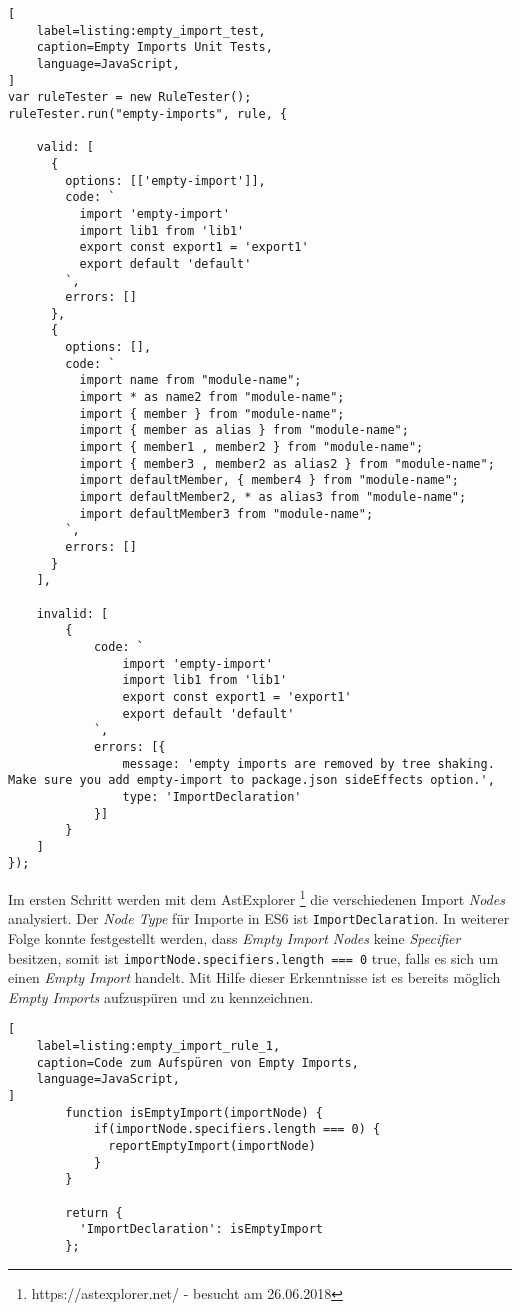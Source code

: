 \begin{lstlisting}[
    label=listing:empty_import_test,
	caption=Empty Imports Unit Tests,
	language=JavaScript,
]
var ruleTester = new RuleTester();
ruleTester.run("empty-imports", rule, {

    valid: [
      {
        options: [['empty-import']],
        code: `
          import 'empty-import'
          import lib1 from 'lib1'
          export const export1 = 'export1'
          export default 'default'
        `,
        errors: []
      },
      {
        options: [],
        code: `
          import name from "module-name";
          import * as name2 from "module-name";
          import { member } from "module-name";
          import { member as alias } from "module-name";
          import { member1 , member2 } from "module-name";
          import { member3 , member2 as alias2 } from "module-name";
          import defaultMember, { member4 } from "module-name";
          import defaultMember2, * as alias3 from "module-name";
          import defaultMember3 from "module-name";
        `,
        errors: []
      }
    ],

    invalid: [
        {
            code: `
                import 'empty-import'
                import lib1 from 'lib1'
                export const export1 = 'export1'
                export default 'default'
            `,
            errors: [{
                message: 'empty imports are removed by tree shaking. Make sure you add empty-import to package.json sideEffects option.',
                type: 'ImportDeclaration'
            }]
        }
    ]
});
\end{lstlisting}

Im ersten Schritt werden mit dem AstExplorer \footnote{https://astexplorer.net/ - besucht am 26.06.2018} die 
verschiedenen Import \textit{Nodes} analysiert. Der \textit{Node Type} für Importe in ES6 ist \lstinline{ImportDeclaration}. In weiterer Folge konnte festgestellt werden, dass \textit{Empty Import Nodes} keine \textit{Specifier} besitzen, somit ist \lstinline{importNode.specifiers.length === 0} true, falls es sich um einen \textit{Empty Import} handelt. Mit Hilfe dieser Erkenntnisse ist es bereits möglich \textit{Empty Imports} aufzuspüren und zu kennzeichnen.

\begin{lstlisting}[
    label=listing:empty_import_rule_1,
	caption=Code zum Aufspüren von Empty Imports,
	language=JavaScript,
]
        function isEmptyImport(importNode) {
            if(importNode.specifiers.length === 0) {
              reportEmptyImport(importNode)
            }
        }

        return {
          'ImportDeclaration': isEmptyImport
        };
\end{lstlisting}

